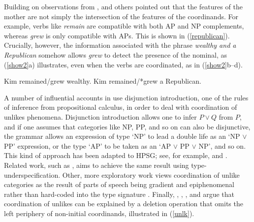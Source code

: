 \noindent
Building on observations from \citet[417]{jacobson}, \citet{Sag:03} and others pointed out that the
features of the mother are not simply the intersection of the features of the coordinands.  For
example, verbs like \emph{remain} are compatible with both AP and NP complements, whereas
\emph{grew} is only compatible with APs.  This is shown in (\ref{republican}).  Crucially,
however, the information associated with the phrase \emph{wealthy and a Republican} somehow allows
\emph{grew} to detect the presence of the nominal, as (\ref{show2}a) illustrates, even when the
verbs are coordinated, as in (\ref{show2}b--d).


\eal
\label{republican}
\ex  Kim remained/grew wealthy.
\ex  Kim remained/*grew a Republican.
\zl



\eal
\label{show2}
\zl


A number of influential accounts in 
\citep{morrill90,morrill94,bayer}
use disjunction introduction, one of the rules of inference from propositional calculus, in order to
deal with coordination of unlikes phenomena. Disjunction introduction allows one to infer $P \vee Q$
from $P$, and if one assumes that categories like NP, PP, and so on can also be disjunctive, the
grammar allows an expression of type `NP' to lead a double life as an `NP $\vee$ PP' expression, or
the type `AP' to be taken as an `AP $\vee$ PP $\vee$ NP', and so on. This kind of approach has been
adapted to HPSG; see, for example, \citet{Daniels02} and \citet{Yatabe:04}.  Related work, such as \citet{Sag:03}, aims to
achieve the same result using type-underspecification. Other, more
exploratory work views coordination of unlike categories as the result of parts of speech being
gradient and epiphenomenal rather than hard-coded into the type signature
\citep{Chaves2013b-u}. Finally, \citet{berthold0}, \citet{yatabe}, \citet{Beavers}, and
\citet{chaves06} argue that coordination of unlikes can be explained by a deletion operation that
omits the left periphery of non-initial coordinands, illustrated in (\ref{unlk}).

